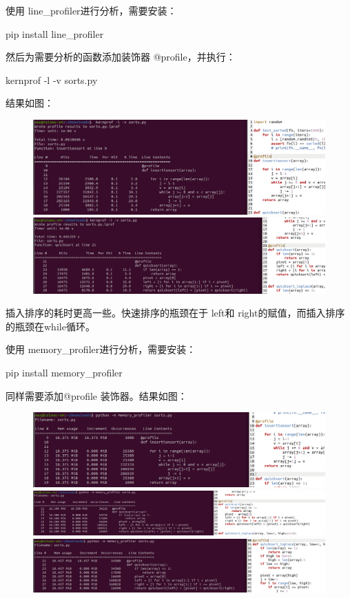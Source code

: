 \documentclass[a4paper, 12pt]{article}
\begin{document}
	使用 line\_profiler进行分析，需要安装：

	pip install line\_profiler
	
	然后为需要分析的函数添加装饰器 @profile，并执行：
	
	kernprof -l -v sorts.py
	
	结果如图：
	
	\begin{figure}[H]
		\centering
		\includegraphics[width=1\textwidth]{004.jpg}
		\includegraphics[width=1\textwidth]{005.jpg}
	\end{figure}
	
	插入排序的耗时更高一些。快速排序的瓶颈在于 left和 right的赋值，而插入排序的瓶颈在while循环。
	
	使用 memory\_profiler进行分析，需要安装：
	
	pip install memory\_profiler
	
	同样需要添加@profile 装饰器。结果如图：
	
	\begin{figure}[H]
		\centering
		\includegraphics[width=1\textwidth]{006.jpg}
		\includegraphics[width=1\textwidth]{007.jpg}
		\includegraphics[width=1\textwidth]{008.jpg}
	\end{figure}
	
\end{document}
